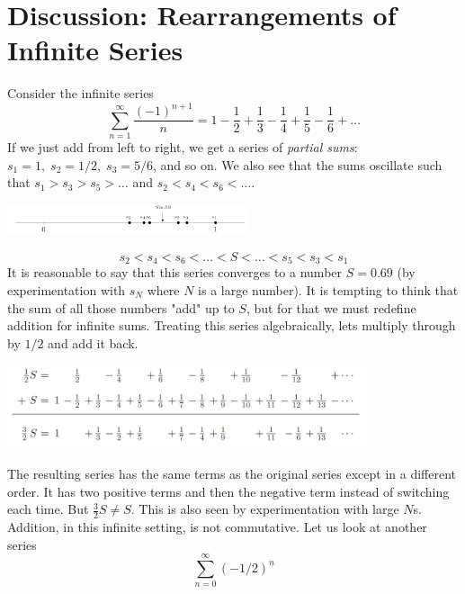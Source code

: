 \section{Discussion: Rearrangements of Infinite Series}
    Consider the infinite series
    \begin{equation*}
        \sum_{n=1}^\infty\frac{(-1)^{n+1}}{n} = 1 - \frac{1}{2} + \frac{1}{3} - \frac{1}{4} + \frac{1}{5} - \frac{1}{6} + \dots 
    \end{equation*}
    If we just add from left to right, we get a series of \textit{partial sums}: $s_1 = 1,\; s_2 = 1/2,\; s_3 = 5/6$, and so on. We also see that the sums oscillate such that $s_1 > s_3 > s_5 > \dots$ and $s_2 < s_4 < s_6 < \dots$.
    \begin{center}
        \includegraphics[width=200pt]{oscillating_converging.png}
    \end{center}
    \begin{equation*}
        s_2 < s_4 < s_6 < \dots < S < \dots < s_5 < s_3 < s_1
    \end{equation*}
    It is reasonable to say that this series converges to a number $S = 0.69$ (by experimentation with $s_N$ where $N$ is a large number). It is tempting to think that the sum of all those numbers "add" up to $S$, but for that we must redefine addition for infinite sums. Treating this series algebraically, lets multiply through by $1/2$ and add it back.
    \begin{center}
        \includegraphics[width=300pt]{communitive.png}
    \end{center}
    The resulting series has the same terms as the original series except in a different order. It has two positive terms and then the negative term instead of switching each time. But $\frac{3}{2}S \neq S$. This is also seen by experimentation with large $N$s. Addition, in this infinite setting, is not commutative.
    \newline \indent
    Let us look at another series
    \begin{equation*}
        \sum_{n=0}^\infty (-1/2)^n
    \end{equation*}
